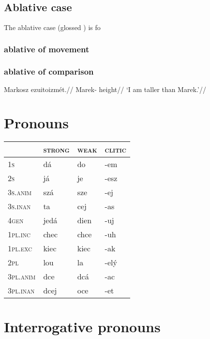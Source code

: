 \subsection{Ablative case}
The ablative case (glossed ) is fo

\subsubsection{ablative of movement}
\subsubsection{ablative of comparison}
\pex
\begingl
\gla Markosz ezuitoizmét.//
\glb Marek- height//
\glft `I am taller than Marek.'//
\endgl
\xe


\section{Pronouns}

\begin{table}[h!]
	\centering \footnotesize
	\begin{tabularx}{0.7\textwidth}{>{\scshape}YMMM}
		\toprule
		 &\textsc{strong} &\textsc{weak}&\textsc{clitic}\\
		\midrule
		1s &dá&do&-em\\ \addlinespace
		2s&já&je&-esz\\ \addlinespace
		3s.anim&szá&sze&-ej\\ \addlinespace
		3s.inan&ta&cej&-as\\ \addlinespace
		4gen&jedá&dien&-uj\\ \addlinespace
		1pl.inc&chec&chce&-uh\\ \addlinespace
		1pl.exc&kiec&kiec&-ak\\ \addlinespace
		2pl&lou&la&-elý\\ \addlinespace
		3pl.anim&dce&dcá&-ac\\ \addlinespace
		3pl.inan&dcej&oce&-et\\ \bottomrule
	\end{tabularx}
\end{table}

\section{Interrogative pronouns}

